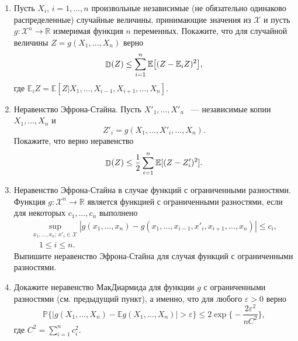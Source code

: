 \begin{problem}
\begin{enumerate}
\item 
Пусть $X_i$, $i=1,\dots,n$ произвольные независимые (не обязательно одинаково распределенные)  случайные величины, принимающие значения из $\mathcal{X}$ и пусть  $g: \mathcal{X}^n\to \mathbb{R}$ измеримая функция $n$ переменных. Покажите, что для случайной величины $Z = g(X_1,\dots,X_n)$ верно 
\begin{equation*}
\mathop{\mathbb{D}}\nolimits(Z) \leq \sum_{i=1}^n \mathbb{E}\big[ (Z-\mathbb{E}_iZ)^2\bigl],
\end{equation*}
где $\mathbb{E}_iZ = \mathbb{E}[Z|X_1,\dots,X_{i-1},X_{i+1},\dots,X_n]$.
\item Неравенство Эфрона-Стайна. Пусть $X'_1,\dots,X'_n$ ~--- независимые копии $X_1,\dots,X_n$ и 
\begin{equation*}
Z'_i = g(X_1,\dots, X'_i,\dots,X_n).
\end{equation*}
Покажите, что верно неравенство 
\begin{equation*}
\mathop{\mathbb{D}}\nolimits(Z)\leq \frac{1}{2}\sum_{i=1}^{n}\mathbb{E}[(Z-Z'_i)^2].
\end{equation*}
\item Неравенство Эфрона-Стайна в случае функций с ограниченными  разностями.
Функция $g: \mathcal{X}^n\to \mathbb{R}$ является функцией с ограниченными разностями, если для некоторых $c_1,\dots,c_n$ выполнено 
\begin{equation*}
\begin{split}
\sup_{x_1,\dots,x_n;\, x'_i\in\mathcal{X}} |g(x_1,\dots,x_n)-g(x_1,\dots,x_{i-1},x'_i,x_{i+1},\dots,x_n)|\leq c_i,\\
\quad 1\leq i\leq n.
\end{split}
\end{equation*}
Выпишите неравенство Эфрона-Стайна для случая функций с ограниченными разностями.
\item Докажите неравенство МакДиармида для функции $g$ с ограниченными разностями  (см. предыдущий пункт), а именно, что для любого $\varepsilon>0$ верно
\begin{equation*}
\mathbb{P}\Big\{\bigl| g(X_1,\dots,X_n)-\mathbb{E}g(X_1,\dots,X_n)\bigr|>\varepsilon\Bigr\}\leq 2\exp\bigg\{-\frac{2\varepsilon^2}{nC^2}\biggr\},
\end{equation*}
 где  $C^2 = \sum_{i=1}^n c_i^2$.

\end{enumerate}

\end{problem}

